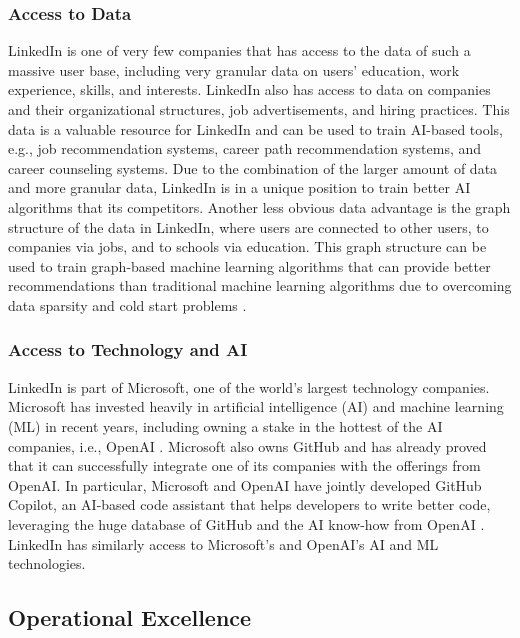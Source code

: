\subsubsection*{Access to Data}

LinkedIn is one of very few companies that has access to the data of such a massive user base, including
very granular data on users' education, work experience, skills, and interests. LinkedIn also has access
to data on companies and their organizational structures, job advertisements, and hiring practices. This
data is a valuable resource for LinkedIn and can be used to train AI-based tools, e.g., job recommendation
systems, career path recommendation systems, and career counseling systems. Due to the combination of the
larger amount of data and more granular data, LinkedIn is in a unique position to train better AI algorithms
that its competitors. Another less obvious data advantage is the graph structure of the data in LinkedIn,
where users are connected to other users, to companies via jobs, and to schools via education. This graph
structure can be used to train graph-based machine learning algorithms that can provide better recommendations
than traditional machine learning algorithms due to overcoming data sparsity and cold start problems
\citep{zhangRecommendingGraphsComprehensive2023}.

\subsubsection*{Access to Technology and AI}

LinkedIn is part of Microsoft, one of the world's largest technology companies. Microsoft has invested heavily
in artificial intelligence (AI) and machine learning (ML) in recent years, including owning a stake in the hottest
of the AI companies, i.e., OpenAI \citep{openaiAnnouncementOpenAIMicrosoft2023}. Microsoft also owns GitHub and has
already proved that it can successfully integrate one of its companies with the offerings from OpenAI. In particular,
Microsoft and OpenAI have jointly developed GitHub Copilot, an AI-based code assistant that helps developers to write
better code, leveraging the huge database of GitHub and the AI know-how from OpenAI \citep{novetMicrosoftOpenAIHave2021}.
LinkedIn has similarly access to Microsoft's and OpenAI's AI and ML technologies. 

\subsection{Operational Excellence}

